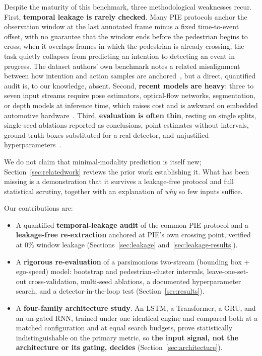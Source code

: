 \documentclass[mti,article,submit,moreauthors]{Definitions/mdpi}
\begin{document}
Despite the maturity of this benchmark, three methodological weaknesses recur. First, \textbf{temporal leakage is rarely checked}. Many PIE protocols anchor the observation window at the last annotated frame minus a fixed time-to-event offset, with no guarantee that the window ends before the pedestrian begins to cross; when it overlaps frames in which the pedestrian is already crossing, the task quietly collapses from predicting an intention to detecting an event in progress. The dataset authors' own benchmark notes a related misalignment between how intention and action samples are anchored~\citep{rasouli2024diving}, but a direct, quantified audit is, to our knowledge, absent. Second, \textbf{recent models are heavy}: three to seven input streams require pose estimators, optical-flow networks, segmentation, or depth models at inference time, which raises cost and is awkward on embedded automotive hardware~\citep{azarmi2025pipnet,xie2025gtranspdm}. Third, \textbf{evaluation is often thin}, resting on single splits, single-seed ablations reported as conclusions, point estimates without intervals, ground-truth boxes substituted for a real detector, and unjustified hyperparameters~\citep{rasouli2024diving,azarmi2024featureimportance}.

We do not claim that minimal-modality prediction is itself new; Section~\ref{sec:relatedwork} reviews the prior work establishing it. What has been missing is a demonstration that it survives a leakage-free protocol and full statistical scrutiny, together with an explanation of \emph{why} so few inputs suffice.

Our contributions are:
\begin{itemize}
\item A quantified \textbf{temporal-leakage audit} of the common PIE protocol and a \textbf{leakage-free re-extraction} anchored at PIE's own crossing point, verified at 0\% window leakage (Sections~\ref{sec:leakage} and~\ref{sec:leakage-results}).
\item A \textbf{rigorous re-evaluation} of a parsimonious two-stream (bounding box + ego-speed) model: bootstrap and pedestrian-cluster intervals, leave-one-set-out cross-validation, multi-seed ablations, a documented hyperparameter search, and a detector-in-the-loop test (Section~\ref{sec:results}).
\item A \textbf{four-family architecture study}. An LSTM, a Transformer, a GRU, and an un-gated RNN, trained under one identical engine and compared both at a matched configuration and at equal search budgets, prove statistically indistinguishable on the primary metric, so \textbf{the input signal, not the architecture or its gating, decides} (Section~\ref{sec:architecture}).
\end{itemize}
\end{document}
